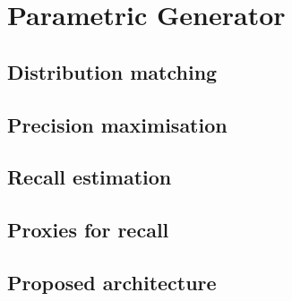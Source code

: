 \documentclass[../main.tex]{subfiles}
\begin{document}
\chapter{Parametric Generator}

\section{Distribution matching}

\section{Precision maximisation}

\section{Recall estimation}

\section{Proxies for recall}

\section{Proposed architecture}
\end{document}
